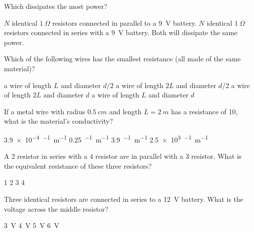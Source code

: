 \question Which dissipates the most power?
\begin{checkboxes}
	\CorrectChoice $N$ identical $\SI{1}{\Omega}$ resistors connected in parallel to a \SI{9}{V} battery.
	\choice $N$ identical $\SI{1}{\Omega}$ resistors connected in series with a \SI{9}{V} battery.
	\choice Both will dissipate the same power.
\end{checkboxes}
\question Which of the following wires has the smallest resistance (all made of the same material)?
\begin{checkboxes}
	\choice a wire of length $L$ and diameter $d/2$
	\choice a wire of length $2L$ and diameter $d/2$
	\choice  a wire of length $2L$ and diameter $d$
	\CorrectChoice a wire of length $L$ and diameter $d$
\end{checkboxes}




\question If a metal wire with radius $\SI{0.5}{cm}$ and length $L=\SI{2}{m}$ has a resistance of \SI{10}{\Omega}, what is the material's conductivity?
\begin{checkboxes}
	\choice \SI{3.9e-4}{\Omega^{-1}m^{-1}}
	\choice \SI{0.25}{\Omega^{-1}m^{-1}}
	\choice \SI{3.9}{\Omega^{-1}m^{-1}}
	\CorrectChoice  \SI{2.5e3}{\Omega^{-1}m^{-1}}
\end{checkboxes}

\question A \SI{2}{\Omega} resistor in series with a \SI{4}{\Omega} resistor are in parallel with a \SI{3}{\Omega} resistor.  What is the equivalent resistance of these three resistors?
\begin{checkboxes}
	\choice \SI{1}{\Omega}
	\CorrectChoice \SI{2}{\Omega}
	\choice \SI{3}{\Omega}
	\choice \SI{4}{\Omega}
\end{checkboxes}

\question  Three identical resistors are connected in series to a \SI{12}{V} battery. What is the voltage across the middle resistor?
\begin{checkboxes}
	\choice \SI{3}{V}
	\CorrectChoice \SI{4}{V}
	\choice \SI{5}{V}
	\choice \SI{6}{V}
\end{checkboxes}

